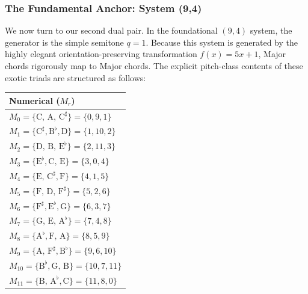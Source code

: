 \documentclass[11pt,letterpaper]{amsart}
\begin{document}
\subsubsection{The Fundamental Anchor: System (9,4)}

We now turn to our second dual pair. In the foundational $(9,4)$ system, the generator is the simple semitone $q = 1$. Because this system is generated by the highly elegant orientation-preserving transformation $f(x) = 5x+1$, Major chords rigorously map to Major chords. The explicit pitch-class contents of these exotic triads are structured as follows:

{\tiny \begin{table}[H]
    \centering
    \begin{minipage}{0.48\textwidth}
        \centering
        \begin{tabular}{l}
        \toprule
        \textbf{Numerical ($M_r$)} \\
        \midrule
        $M_0 = \{\text{C, A, C}^\sharp\} = \{0, 9, 1\}$ \\
        $M_1 = \{\text{C}^\sharp, \text{B}^\flat, \text{D}\} = \{1, 10, 2\}$ \\
        $M_2 = \{\text{D, B, E}^\flat\} = \{2, 11, 3\}$ \\
        $M_3 = \{\text{E}^\flat, \text{C, E}\} = \{3, 0, 4\}$ \\
        $M_4 = \{\text{E, C}^\sharp, \text{F}\} = \{4, 1, 5\}$ \\
        $M_5 = \{\text{F, D, F}^\sharp\} = \{5, 2, 6\}$ \\
        $M_6 = \{\text{F}^\sharp, \text{E}^\flat, \text{G}\} = \{6, 3, 7\}$ \\
        $M_7 = \{\text{G, E, A}^\flat\} = \{7, 4, 8\}$ \\
        $M_8 = \{\text{A}^\flat, \text{F, A}\} = \{8, 5, 9\}$ \\
        $M_9 = \{\text{A, F}^\sharp, \text{B}^\flat\} = \{9, 6, 10\}$ \\
        $M_{10} = \{\text{B}^\flat, \text{G, B}\} = \{10, 7, 11\}$ \\
        $M_{11} = \{\text{B, A}^\flat, \text{C}\} = \{11, 8, 0\}$ \\
        \bottomrule
        \end{tabular}
    \end{minipage}\hfill
    \begin{minipage}{0.48\textwidth}
        \centering
        \begin{tabular}{l}

\end{tabular}
\end{minipage}
\end{table}}
\end{document}
